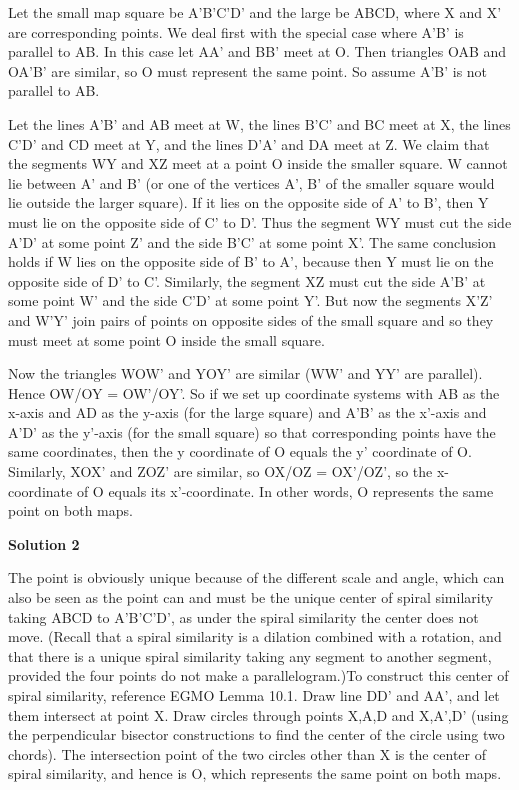 \begin{enumerate}
 Let the small map square be A'B'C'D' and the large be ABCD, where X and X' are corresponding points. We deal first with the special case where A'B' is parallel to AB. In this case let AA' and BB' meet at O. Then triangles OAB and OA'B' are similar, so O must represent the same point. So assume A'B' is not parallel to AB.

 Let the lines A'B' and AB meet at W, the lines B'C' and BC meet at X, the lines C'D' and CD meet at Y, and the lines D'A' and DA meet at Z. We claim that the segments WY and XZ meet at a point O inside the smaller square. W cannot lie between A' and B' (or one of the vertices A', B' of the smaller square would lie outside the larger square). If it lies on the opposite side of A' to B', then Y must lie on the opposite side of C' to D'. Thus the segment WY must cut the side A'D' at some point Z' and the side B'C' at some point X'. The same conclusion holds if W lies on the opposite side of B' to A', because then Y must lie on the opposite side of D' to C'. Similarly, the segment XZ must cut the side A'B' at some point W' and the side C'D' at some point Y'. But now the segments X'Z' and W'Y' join pairs of points on opposite sides of the small square and so they must meet at some point O inside the small square.

 Now the triangles WOW' and YOY' are similar (WW' and YY' are parallel). Hence OW/OY = OW'/OY'. So if we set up coordinate systems with AB as the x-axis and AD as the y-axis (for the large square) and A'B' as the x'-axis and A'D' as the y'-axis (for the small square) so that corresponding points have the same coordinates, then the y coordinate of O equals the y' coordinate of O. Similarly, XOX' and ZOZ' are similar, so OX/OZ = OX'/OZ', so the x-coordinate of O equals its x'-coordinate. In other words, O represents the same point on both maps.

 



\textbf{Solution 2}

The point is obviously unique because of the different scale and angle, which can also be seen as the point can and must be the unique center of spiral similarity taking ABCD to A'B'C'D', as under the spiral similarity the center does not move. (Recall that a spiral similarity is a dilation combined with a rotation, and that there is a unique spiral similarity taking any segment to another segment, provided the four points do not make a parallelogram.)To construct this center of spiral similarity, reference EGMO Lemma 10.1. Draw line DD' and AA', and let them intersect at point X. Draw circles through points X,A,D and X,A',D' (using the perpendicular bisector constructions to find the center of the circle using two chords). The intersection point of the two circles other than X is the center of spiral similarity, and hence is O, which represents the same point on both maps.


\end{enumerate}
